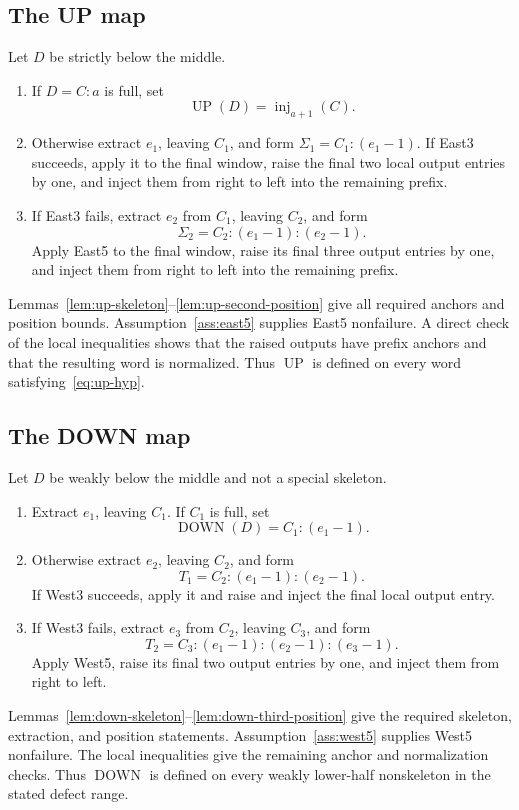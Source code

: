 \documentclass[11pt]{article}
\theoremstyle{definition}
\theoremstyle{remark}
\newcommand{\UP}{\operatorname{UP}}
\newcommand{\DOWN}{\operatorname{DOWN}}
\newcommand{\inj}{\operatorname{inj}}
\begin{document}
\subsection{The UP map}

Let $D$ be strictly below the middle.
\begin{enumerate}
\item If $D=C:a$ is full, set
\[
  \UP(D)=\inj_{a+1}(C).
\]
\item Otherwise extract $e_1$, leaving $C_1$, and form
$\Sigma_1=C_1:(e_1-1)$.  If East3 succeeds, apply it to the final window,
raise the final two local output entries by one, and inject them from right
to left into the remaining prefix.
\item If East3 fails, extract $e_2$ from $C_1$, leaving $C_2$, and form
\[
  \Sigma_2=C_2:(e_1-1):(e_2-1).
\]
Apply East5 to the final window, raise its final three output entries by one,
and inject them from right to left into the remaining prefix.
\end{enumerate}

Lemmas~\ref{lem:up-skeleton}--\ref{lem:up-second-position} give all required
anchors and position bounds.  Assumption~\ref{ass:east5} supplies East5
nonfailure.  A direct check of the local inequalities shows that the raised
outputs have prefix anchors and that the resulting word is normalized.
Thus $\UP$ is defined on every word satisfying~\eqref{eq:up-hyp}.

\subsection{The DOWN map}

Let $D$ be weakly below the middle and not a special skeleton.
\begin{enumerate}
\item Extract $e_1$, leaving $C_1$.  If $C_1$ is full, set
\[
  \DOWN(D)=C_1:(e_1-1).
\]
\item Otherwise extract $e_2$, leaving $C_2$, and form
\[
  T_1=C_2:(e_1-1):(e_2-1).
\]
If West3 succeeds, apply it and raise and inject the final local output entry.
\item If West3 fails, extract $e_3$ from $C_2$, leaving $C_3$, and form
\[
  T_2=C_3:(e_1-1):(e_2-1):(e_3-1).
\]
Apply West5, raise its final two output entries by one, and inject them from
right to left.
\end{enumerate}

Lemmas~\ref{lem:down-skeleton}--\ref{lem:down-third-position} give the
required skeleton, extraction, and position statements.
Assumption~\ref{ass:west5} supplies West5 nonfailure.  The local inequalities
give the remaining anchor and normalization checks.  Thus $\DOWN$ is defined
on every weakly lower-half nonskeleton in the stated defect range.
\end{document}
